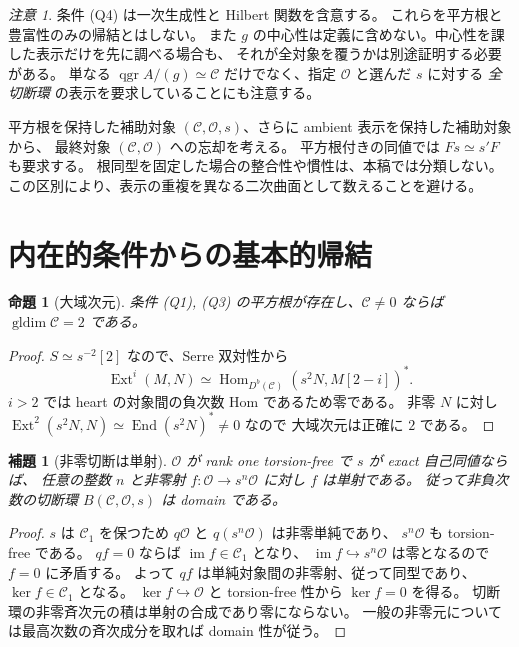 \documentclass[a4paper,11pt]{ltjsarticle}
\numberwithin{equation}{section}
\theoremstyle{plain}
\newtheorem{proposition}[theorem]{命題}
\newtheorem{lemma}[theorem]{補題}
\theoremstyle{definition}
\theoremstyle{remark}
\newtheorem{remark}[theorem]{注意}
\newcommand{\OO}{\mathcal O}
\newcommand{\cC}{\mathcal C}
\DeclareMathOperator{\Hom}{Hom}
\DeclareMathOperator{\End}{End}
\DeclareMathOperator{\Ext}{Ext}
\DeclareMathOperator{\qgr}{qgr}
\DeclareMathOperator{\gldim}{gldim}
\begin{document}
\begin{remark}
条件 (Q4) は一次生成性と Hilbert 関数を含意する。
これらを平方根と豊富性のみの帰結とはしない。
また $g$ の中心性は定義に含めない。中心性を課した表示だけを先に調べる場合も、
それが全対象を覆うかは別途証明する必要がある。
単なる $\qgr A/(g)\simeq\cC$ だけでなく、指定 $\OO$ と選んだ $s$ に対する
\emph{全切断環} の表示を要求していることにも注意する。
\end{remark}

平方根を保持した補助対象 $(\cC,\OO,s)$、さらに ambient 表示を保持した補助対象から、
最終対象 $(\cC,\OO)$ への忘却を考える。
平方根付きの同値では $Fs\simeq s'F$ も要求する。
根同型を固定した場合の整合性や慣性は、本稿では分類しない。
この区別により、表示の重複を異なる二次曲面として数えることを避ける。



\section{内在的条件からの基本的帰結}
\label{sec:categorical-consequences}

\begin{proposition}[大域次元]
\label{prop:gldim-two}
条件 (Q1), (Q3) の平方根が存在し、$\cC\ne0$ ならば $\gldim\cC=2$ である。
\end{proposition}
\begin{proof}
$S\simeq s^{-2}[2]$ なので、Serre 双対性から
\[
 \Ext^i(M,N)\simeq\Hom_{D^b(\cC)}(s^2N,M[2-i])^* .
\]
$i>2$ では heart の対象間の負次数 Hom であるため零である。
非零 $N$ に対し $\Ext^2(s^2N,N)\simeq\End(s^2N)^*\ne0$ なので
大域次元は正確に $2$ である。
\end{proof}

\begin{lemma}[非零切断は単射]
\label{lem:sections-monic}
$\OO$ が rank one torsion-free で $s$ が exact 自己同値ならば、
任意の整数 $n$ と非零射 $f:\OO\to s^n\OO$ に対し $f$ は単射である。
従って非負次数の切断環 $B(\cC,\OO,s)$ は domain である。
\end{lemma}
\begin{proof}
$s$ は $\cC_1$ を保つため $q\OO$ と $q(s^n\OO)$ は非零単純であり、
$s^n\OO$ も torsion-free である。
$qf=0$ ならば $\operatorname{im}f\in\cC_1$ となり、
$\operatorname{im}f\hookrightarrow s^n\OO$ は零となるので $f=0$ に矛盾する。
よって $qf$ は単純対象間の非零射、従って同型であり、$\ker f\in\cC_1$ となる。
$\ker f\hookrightarrow\OO$ と torsion-free 性から $\ker f=0$ を得る。
切断環の非零斉次元の積は単射の合成であり零にならない。
一般の非零元については最高次数の斉次成分を取れば domain 性が従う。
\end{proof}
\end{document}
